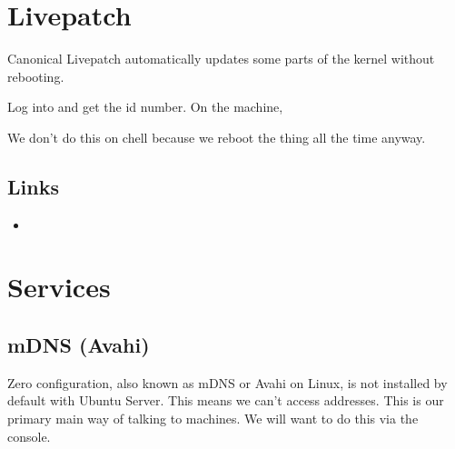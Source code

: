 \documentclass[a4paper,10pt,english]{sphinxmanual}
\begin{document}
\chapter{Livepatch}
\label{\detokenize{livepatch:livepatch}}\label{\detokenize{livepatch::doc}}
Canonical Livepatch automatically updates some parts of the kernel without
rebooting.

Log into  and get the id number. On the machine,

\begin{sphinxVerbatim}[commandchars=\\\{\}]
   
   
  
\end{sphinxVerbatim}

We don’t do this on chell because we reboot the thing all the time anyway.


\section{Links}
\label{\detokenize{livepatch:links}}\begin{itemize}
\item {} 

\end{itemize}


\chapter{Services}
\label{\detokenize{services:services}}\label{\detokenize{services::doc}}

\section{mDNS (Avahi)}
\label{\detokenize{services:mdns-avahi}}
Zero configuration, also known as mDNS or Avahi on Linux, is not installed by
default with Ubuntu Server. This means we can’t access  addresses.
This is our primary main way of talking to machines. We will want to do this via
the console.

\begin{sphinxVerbatim}[commandchars=\\\{\}]
   
   
\end{sphinxVerbatim}
\end{document}
